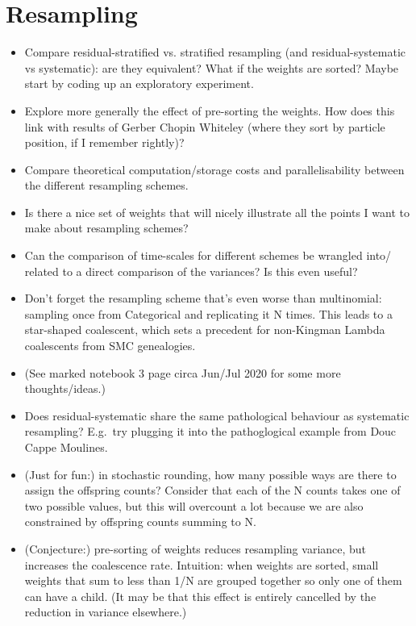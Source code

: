 \documentclass{article}
\begin{document}
\section*{Resampling}
\begin{itemize}
\item Compare residual-stratified vs. stratified resampling (and residual-systematic vs systematic): are they equivalent? What if the weights are sorted? Maybe start by coding up an exploratory experiment.
\item Explore more generally the effect of pre-sorting the weights. How does this link with results of Gerber Chopin Whiteley (where they sort by particle position, if I remember rightly)?
\item Compare theoretical computation/storage costs and parallelisability between the different resampling schemes.
\item Is there a nice set of weights that will nicely illustrate all the points I want to make about resampling schemes?
\item Can the comparison of time-scales for different schemes be wrangled into/ related to a direct comparison of the variances? Is this even useful?
\item Don't forget the resampling scheme that's even worse than multinomial: sampling once from Categorical and replicating it N times. This leads to a star-shaped coalescent, which sets a precedent for non-Kingman Lambda coalescents from SMC genealogies.
\item (See marked notebook 3 page circa Jun/Jul 2020 for some more thoughts/ideas.)
\item Does residual-systematic share the same pathological behaviour as systematic resampling? E.g.\ try plugging it into the pathoglogical example from Douc Cappe Moulines.
\item (Just for fun:) in stochastic rounding, how many possible ways are there to assign the offspring counts? Consider that each of the N counts takes one of two possible values, but this will overcount a lot because we are also constrained by offspring counts summing to N.
\item (Conjecture:) pre-sorting of weights reduces resampling variance, but increases the coalescence rate. Intuition: when weights are sorted, small weights that sum to less than 1/N are grouped together so only one of them can have a child. (It may be that this effect is entirely cancelled by the reduction in variance elsewhere.)
\end{itemize}
\end{document}
